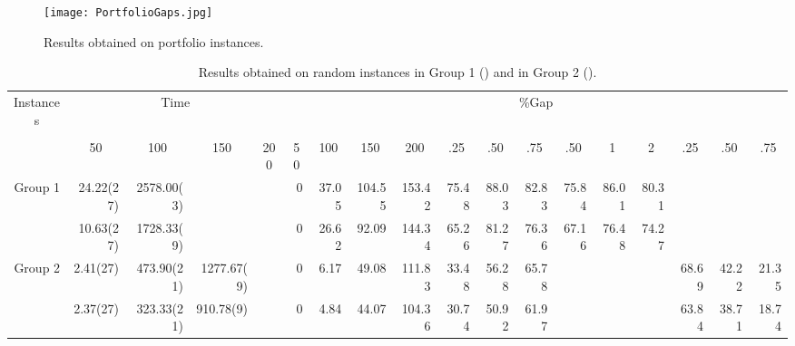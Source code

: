 \begin{figure}[Hp]
\hspace{-1cm}
\texttt{[image: PortfolioGaps.jpg]}
\caption{\footnotesize Results obtained on portfolio instances.}
\label{resEconomyGraspxDFSxBFS}
\end{figure}

\begin{sidewaystable}[Hp]
\footnotesize
\begin{center}
\begin{tabular}{r||rrrr||rrrr|rrr|rrr|rrr}
\hline
\multicolumn{1}{c||}{Instances} &
\multicolumn{4}{c||}{Time} &
\multicolumn{13}{c}{\%Gap} \\
\multicolumn{1}{c||}{} &
\multicolumn{4}{c||}{} &
\multicolumn{4}{c|}{} &
\multicolumn{3}{c|}{} &
\multicolumn{3}{c|}{} &
\multicolumn{3}{c}{} \\
& \multicolumn{1}{c}{50}&
 \multicolumn{1}{c}{100}&
 \multicolumn{1}{c}{150}&
 \multicolumn{1}{c||}{200}&
 \multicolumn{1}{c}{50}&
 \multicolumn{1}{c}{100}&
 \multicolumn{1}{c}{150}&
 \multicolumn{1}{c|}{200}&
 \multicolumn{1}{c}{.25} &
 \multicolumn{1}{c}{.50} &
 \multicolumn{1}{c|}{.75} &
 \multicolumn{1}{c}{.50}  &
 \multicolumn{1}{c}{1}   &
 \multicolumn{1}{c|}{2}   &
 \multicolumn{1}{c}{.25} &
 \multicolumn{1}{c}{.50} &
 \multicolumn{1}{c}{.75} \\
\hline\hline
Group 1 &24.22(27)&2578.00(3)&       &    & 0	 & 37.05 & 104.55 &	153.42 & 75.48  & 88.03	& 82.83	& 75.84	& 86.01& 80.31&&&\\	
        &10.63(27)&1728.33(9)&       &    & 0	 & 26.62 &	92.09 &	144.34 & 65.26  & 81.27 & 76.36 & 67.16 & 76.48& 74.27&&&\\
\hline
Group 2 &2.41(27)&473.90(21)&1277.67(9)&  & 0	 & 6.17	 &  49.08 &	111.83 & 33.48	& 56.28	& 65.78 &&&& 68.69 & 42.22 & 21.35 \\
        &2.37(27)&323.33(21)&910.78(9)&  & 0	 & 4.84  &	44.07 &	104.36 & 30.74  & 50.92 & 61.97 &&&& 63.84 & 38.71 & 18.74 \\
\hline\hline
\end{tabular}
\end{center}
\caption{\footnotesize Results obtained on random instances in Group 1 () and in Group 2 ().}
\label{resRandomInstBC}
\normalsize
\end{sidewaystable}

